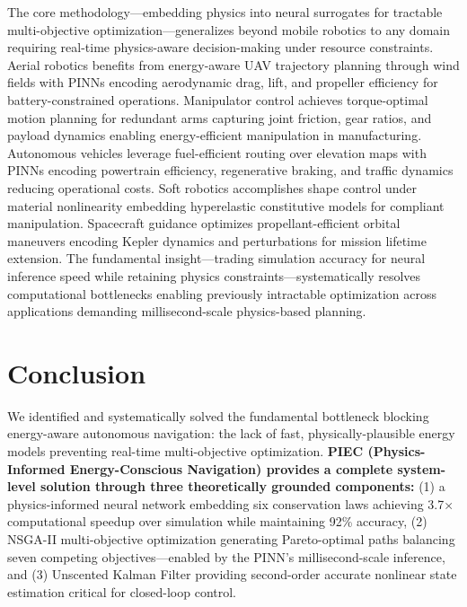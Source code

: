 \documentclass[pdflatex,sn-nature]{sn-jnl}%
\begin{document}
The core methodology—embedding physics into neural surrogates for tractable multi-objective optimization—generalizes beyond mobile robotics to any domain requiring real-time physics-aware decision-making under resource constraints. Aerial robotics benefits from energy-aware UAV trajectory planning through wind fields with PINNs encoding aerodynamic drag, lift, and propeller efficiency for battery-constrained operations. Manipulator control achieves torque-optimal motion planning for redundant arms capturing joint friction, gear ratios, and payload dynamics enabling energy-efficient manipulation in manufacturing. Autonomous vehicles leverage fuel-efficient routing over elevation maps with PINNs encoding powertrain efficiency, regenerative braking, and traffic dynamics reducing operational costs. Soft robotics accomplishes shape control under material nonlinearity embedding hyperelastic constitutive models for compliant manipulation. Spacecraft guidance optimizes propellant-efficient orbital maneuvers encoding Kepler dynamics and perturbations for mission lifetime extension. The fundamental insight—trading simulation accuracy for neural inference speed while retaining physics constraints—systematically resolves computational bottlenecks enabling previously intractable optimization across applications demanding millisecond-scale physics-based planning.

\section{Conclusion}

We identified and systematically solved the fundamental bottleneck blocking energy-aware autonomous navigation: the lack of fast, physically-plausible energy models preventing real-time multi-objective optimization. \textbf{PIEC (Physics-Informed Energy-Conscious Navigation) provides a complete system-level solution through three theoretically grounded components:} (1) a physics-informed neural network embedding six conservation laws achieving 3.7× computational speedup over simulation while maintaining 92\% accuracy, (2) NSGA-II multi-objective optimization generating Pareto-optimal paths balancing seven competing objectives—enabled by the PINN's millisecond-scale inference, and (3) Unscented Kalman Filter providing second-order accurate nonlinear state estimation critical for closed-loop control.
\end{document}
